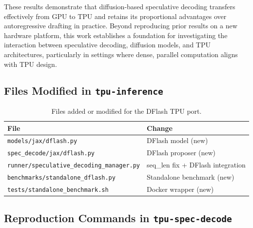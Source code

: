 \documentclass[12pt,letterpaper]{article}
\begin{document}
These results demonstrate that diffusion-based speculative decoding transfers effectively from GPU to TPU and retains its proportional advantages over autoregressive drafting in practice. Beyond reproducing prior results on a new hardware platform, this work establishes a foundation for investigating the interaction between speculative decoding, diffusion models, and TPU architectures, particularly in settings where dense, parallel computation aligns with TPU design.

\clearpage


\makereference





\clearpage
\makeappendix

\subsection{Files Modified in \texttt{tpu-inference}}

\begin{table}[htbp]
\caption{Files added or modified for the DFlash TPU port.}
\centering
\begin{tabular}{l|l}
\toprule
File & Change \\
\midrule
\texttt{models/jax/dflash.py} & DFlash model (new) \\
\texttt{spec\_decode/jax/dflash.py} & DFlash proposer (new) \\
\texttt{runner/speculative\_decoding\_manager.py} & seq\_len fix + DFlash integration \\
\texttt{benchmarks/standalone\_dflash.py} & Standalone benchmark (new) \\
\texttt{tests/standalone\_benchmark.sh} & Docker wrapper (new) \\
\bottomrule
\end{tabular}
\end{table}

\subsection{Reproduction Commands in \texttt{tpu-spec-decode}}
\end{document}
